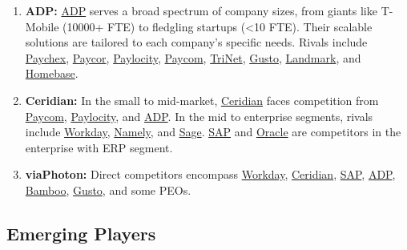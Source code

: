 \documentclass[
  a4paper,
]{book}
\renewcommand{\labelenumi}{\textbf{\textcolor{com-color}{\arabic*.}}}%
\begin{document}
\begin{enumerate}
\def\labelenumi{\arabic{enumi}.}
\item
  \textbf{ADP:} \href{https://www.adp.com/}{ADP} serves a broad spectrum
  of company sizes, from giants like T-Mobile (10000+ FTE) to fledgling
  startups (\textless10 FTE). Their scalable solutions are tailored to
  each company's specific needs. Rivals include
  \href{https://www.paychex.com/}{Paychex},
  \href{https://www.paycor.com/}{Paycor},
  \href{https://www.paylocity.com/}{Paylocity},
  \href{https://www.paycom.com/}{Paycom},
  \href{https://www.trinet.com/}{TriNet},
  \href{https://gusto.com/}{Gusto},
  \href{https://www.landmarkpayroll.com/}{Landmark}, and
  \href{https://www.joinhomebase.com/}{Homebase}.
\item
  \textbf{Ceridian:} In the small to mid-market,
  \href{https://www.ceridian.com/}{Ceridian} faces competition from
  \href{https://www.paycom.com/}{Paycom},
  \href{https://www.paylocity.com/}{Paylocity}, and
  \href{https://www.adp.com/}{ADP}. In the mid to enterprise segments,
  rivals include \href{https://www.workday.com/}{Workday},
  \href{https://www.namely.com/}{Namely}, and
  \href{https://www.sage.com/}{Sage}. \href{https://www.sap.com/}{SAP}
  and \href{https://www.oracle.com/}{Oracle} are competitors in the
  enterprise with ERP segment.
\item
  \textbf{viaPhoton:} Direct competitors encompass
  \href{https://www.workday.com/}{Workday},
  \href{https://www.ceridian.com/}{Ceridian},
  \href{https://www.sap.com/}{SAP}, \href{https://www.adp.com/}{ADP},
  \href{https://www.bamboohr.com/}{Bamboo},
  \href{https://gusto.com/}{Gusto}, and some PEOs.
\end{enumerate}

\hypertarget{emerging-players}{%
\subsection{Emerging Players}\label{emerging-players}}
\end{document}
